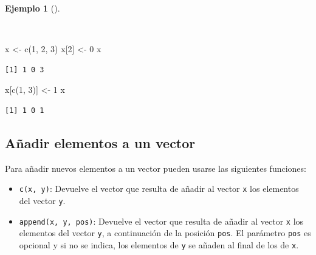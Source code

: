 \documentclass[
  spanish,
  a4paper,
]{scrreport}
\newenvironment{Shaded}{\begin{snugshade}}{\end{snugshade}}
\newcommand{\DecValTok}[1]{\textcolor[rgb]{0.68,0.00,0.00}{#1}}
\newcommand{\FunctionTok}[1]{\textcolor[rgb]{0.28,0.35,0.67}{#1}}
\newcommand{\NormalTok}[1]{\textcolor[rgb]{0.00,0.23,0.31}{#1}}
\newcommand{\OtherTok}[1]{\textcolor[rgb]{0.00,0.23,0.31}{#1}}
\providecommand{\tightlist}{%
  \setlength{\itemsep}{0pt}\setlength{\parskip}{0pt}}
\theoremstyle{definition}
\theoremstyle{definition}
\newtheorem{example}{Ejemplo}[chapter]
\theoremstyle{remark}
\begin{document}
\begin{example}[]\protect\hypertarget{exm-modificacion-vectores}{}\label{exm-modificacion-vectores}

~

\begin{Shaded}
\begin{Highlighting}[]
\NormalTok{x }\OtherTok{\textless{}{-}} \FunctionTok{c}\NormalTok{(}\DecValTok{1}\NormalTok{, }\DecValTok{2}\NormalTok{, }\DecValTok{3}\NormalTok{)}
\NormalTok{x[}\DecValTok{2}\NormalTok{] }\OtherTok{\textless{}{-}} \DecValTok{0}
\NormalTok{x}
\end{Highlighting}
\end{Shaded}

\begin{verbatim}
[1] 1 0 3
\end{verbatim}

\begin{Shaded}
\begin{Highlighting}[]
\NormalTok{x[}\FunctionTok{c}\NormalTok{(}\DecValTok{1}\NormalTok{, }\DecValTok{3}\NormalTok{)] }\OtherTok{\textless{}{-}} \DecValTok{1}
\NormalTok{x}
\end{Highlighting}
\end{Shaded}

\begin{verbatim}
[1] 1 0 1
\end{verbatim}

\end{example}

\subsection{Añadir elementos a un
vector}\label{auxf1adir-elementos-a-un-vector}

Para añadir nuevos elementos a un vector pueden usarse las siguientes
funciones:

\begin{itemize}
\tightlist
\item
  \texttt{c(x,\ y)}: Devuelve el vector que resulta de añadir al vector
  \texttt{x} los elementos del vector \texttt{y}.
\item
  \texttt{append(x,\ y,\ pos)}: Devuelve el vector que resulta de añadir
  al vector \texttt{x} los elementos del vector \texttt{y}, a
  continuación de la posición \texttt{pos}. El parámetro \texttt{pos} es
  opcional y si no se indica, los elementos de \texttt{y} se añaden al
  final de los de \texttt{x}.
\end{itemize}
\end{document}

